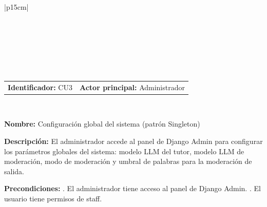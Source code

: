 \begingroup
{} %
\setlength{\arrayrulewidth}{1pt}
\begin{longtable}{|p{15cm}|}
  
  \hline
   \\
  \hline
  \endfirsthead
  
   \\
  \hline
   \\
  \hline
  \endhead
  
  \hline {} \\ \hline
  \endfoot
  
  \hline
  \caption{Caso de uso 3 — Configuración global por el administrador.}
  \label{TB:CU3_SINGLETON}
  \endlastfoot

  \begin{tabularx}{\linewidth}{@{}X X@{}}
    \textbf{Identificador:} CU3 & \textbf{Actor principal:} Administrador
  \end{tabularx} \\ \hline

  \textbf{Nombre:} Configuración global del sistema (patrón Singleton) \\ \hline

  \textbf{Descripción:} \newline 
  El administrador accede al panel de Django Admin para configurar los parámetros globales del sistema: modelo LLM del tutor, modelo LLM de moderación, modo de moderación y umbral de palabras para la moderación de salida. \\ \hline

  \textbf{Precondiciones:} . El administrador tiene acceso al panel de Django Admin. . El usuario tiene permisos de staff. \\ \hline


\end{longtable}
